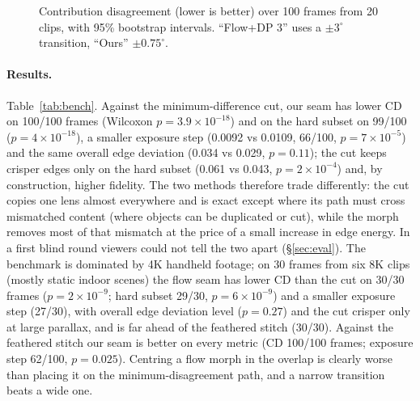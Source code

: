 \documentclass[11pt]{article}
\begin{document}
\begin{figure}[t]
\centering
{}
\caption{Contribution disagreement (lower is better) over 100 frames from 20 clips, with 95\% bootstrap intervals. ``Flow+DP 3'' uses a $\pm3^\circ$ transition, ``Ours'' $\pm0.75^\circ$.}
\label{fig:bench}
\end{figure}

\paragraph{Results.} Table~\ref{tab:bench}. Against the minimum-difference cut, our seam has lower CD on 100/100 frames (Wilcoxon $p=3.9\times10^{-18}$) and on the hard subset on 99/100 ($p=4\times10^{-18}$), a smaller exposure step (0.0092 vs 0.0109, 66/100, $p=7\times10^{-5}$) and the same overall edge deviation (0.034 vs 0.029, $p=0.11$); the cut keeps crisper edges only on the hard subset (0.061 vs 0.043, $p=2\times10^{-4}$) and, by construction, higher fidelity. The two methods therefore trade differently: the cut copies one lens almost everywhere and is exact except where its path must cross mismatched content (where objects can be duplicated or cut), while the morph removes most of that mismatch at the price of a small increase in edge energy. In a first blind round viewers could not tell the two apart (\S\ref{sec:eval}). The benchmark is dominated by 4K handheld footage; on 30 frames from six 8K clips (mostly static indoor scenes) the flow seam has lower CD than the cut on 30/30 frames ($p=2\times10^{-9}$; hard subset 29/30, $p=6\times10^{-9}$) and a smaller exposure step (27/30), with overall edge deviation level ($p=0.27$) and the cut crisper only at large parallax, and is far ahead of the feathered stitch (30/30). Against the feathered stitch our seam is better on every metric (CD 100/100 frames; exposure step 62/100, $p=0.025$). Centring a flow morph in the overlap is clearly worse than placing it on the minimum-disagreement path, and a narrow transition beats a wide one.
\end{document}
